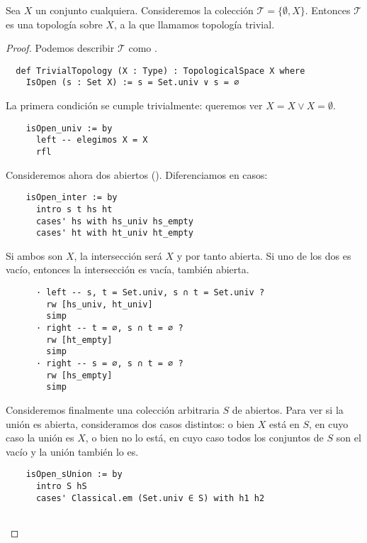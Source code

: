 \begin{example}\label{ex:topologia-trivial}
    Sea $X$ un conjunto cualquiera. Consideremos la colección $\mathcal{T}=\{\emptyset, X\}$. Entonces $\mathcal{T}$ es una topología sobre $X$, a la que llamamos \textnormal{topología trivial}.
\end{example}

\begin{proof}
  Podemos describir $\mathcal{T}$ como .

  \begin{lstlisting}
  def TrivialTopology (X : Type) : TopologicalSpace X where
    IsOpen (s : Set X) := s = Set.univ ∨ s = ∅ \end{lstlisting}

  La primera condición se cumple trivialmente: queremos ver $X = X \lor X = \emptyset$.

  \begin{lstlisting}
    isOpen_univ := by
      left -- elegimos X = X
      rfl\end{lstlisting}

  Consideremos ahora dos abiertos (). Diferenciamos en casos:

  \begin{lstlisting}
    isOpen_inter := by
      intro s t hs ht
      cases' hs with hs_univ hs_empty
      cases' ht with ht_univ ht_empty \end{lstlisting}

  Si ambos son $X$, la intersección será $X$ y por tanto abierta. Si uno de los dos es vacío, entonces la intersección es vacía, también abierta.

  \begin{lstlisting}
      · left -- s, t = Set.univ, s ∩ t = Set.univ ?
        rw [hs_univ, ht_univ]
        simp
      · right -- t = ∅, s ∩ t = ∅ ?
        rw [ht_empty]
        simp
      · right -- s = ∅, s ∩ t = ∅ ?
        rw [hs_empty]
        simp \end{lstlisting}

  Consideremos finalmente una colección arbitraria $S$ de abiertos. Para ver si la unión es abierta, consideramos dos casos distintos: o bien $X$ está en $S$, en cuyo caso la unión es $X$, o bien no lo está, en cuyo caso todos los conjuntos de $S$ son el vacío y la unión también lo es.

  \begin{lstlisting}
    isOpen_sUnion := by
      intro S hS
      cases' Classical.em (Set.univ ∈ S) with h1 h2


\end{lstlisting}
\end{proof}
